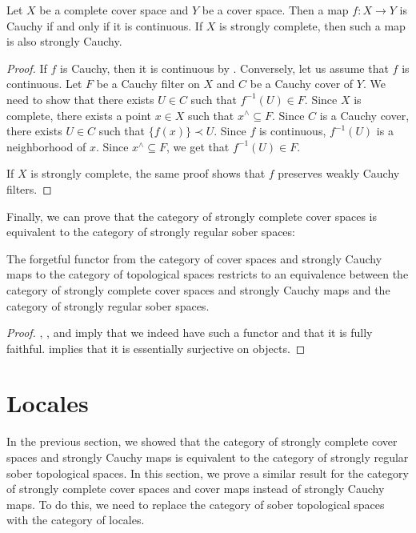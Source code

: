 \documentclass[reqno]{amsart}
\theoremstyle{definition}
\theoremstyle{remark}
\numberwithin{figure}{section}
\newcommand{\rb}{\prec}
\begin{document}
\begin{prop}
Let $X$ be a complete cover space and $Y$ be a cover space.
Then a map $f : X \to Y$ is Cauchy if and only if it is continuous.
If $X$ is strongly complete, then such a map is also strongly Cauchy.
\end{prop}
\begin{proof}
If $f$ is Cauchy, then it is continuous by .
Conversely, let us assume that $f$ is continuous.
Let $F$ be a Cauchy filter on $X$ and $C$ be a Cauchy cover of $Y$.
We need to show that there exists $U \in C$ such that $f^{-1}(U) \in F$.
Since $X$ is complete, there exists a point $x \in X$ such that $x^\wedge \subseteq F$.
Since $C$ is a Cauchy cover, there exists $U \in C$ such that $\{ f(x) \} \rb U$.
Since $f$ is continuous, $f^{-1}(U)$ is a neighborhood of $x$.
Since $x^\wedge \subseteq F$, we get that $f^{-1}(U) \in F$.

If $X$ is strongly complete, the same proof shows that $f$ preserves weakly Cauchy filters.
\end{proof}

Finally, we can prove that the category of strongly complete cover spaces is equivalent to the category of strongly regular sober spaces:

\begin{thm}
The forgetful functor from the category of cover spaces and strongly Cauchy maps to the category of topological spaces restricts to an equivalence between the category of strongly complete cover spaces and strongly Cauchy maps and the category of strongly regular sober spaces.
\end{thm}
\begin{proof}
, , and  imply that we indeed have such a functor and that it is fully faithful.
 implies that it is essentially surjective on objects.
\end{proof}

\section{Locales}
\label{sec:locales}

In the previous section, we showed that the category of strongly complete cover spaces and strongly Cauchy maps is equivalent to the category of strongly regular sober topological spaces.
In this section, we prove a similar result for the category of strongly complete cover spaces and cover maps instead of strongly Cauchy maps.
To do this, we need to replace the category of sober topological spaces with the category of locales.
\end{document}
